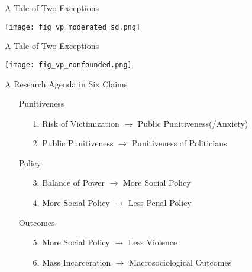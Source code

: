\documentclass{beamer}
\begin{document}
\begin{frame}{A Tale of Two Exceptions}
\begin{center}
        \texttt{[image: fig\_vp\_moderated\_sd.png]}
\end{center}
\end{frame}

\begin{frame}{A Tale of Two Exceptions}
\begin{center}
        \texttt{[image: fig\_vp\_confounded.png]}
\end{center}
\end{frame}

\begin{frame}{A Research Agenda in Six Claims}
    \begin{itemize}
        \item[] \alert{Punitiveness}
        \begin{itemize}
        \item[1.] Risk of Victimization $\rightarrow$ Public Punitiveness(/Anxiety)
        \item[2.] Public Punitiveness $\rightarrow$ Punitiveness of Politicians
        \end{itemize}
        \item[] \alert{Policy}
        \begin{itemize}
        \item[3.] Balance of Power $\rightarrow$ More Social Policy
        \item[4.] More Social Policy $\rightarrow$ Less Penal Policy
        \end{itemize}
        \item[] \alert{Outcomes}
        \begin{itemize}
        \item[5.] More Social Policy $\rightarrow$ Less Violence
        \item[6.] Mass Incarceration $\rightarrow$ Macrosociological Outcomes
        \end{itemize}
    \end{itemize}
\end{frame}
\end{document}
